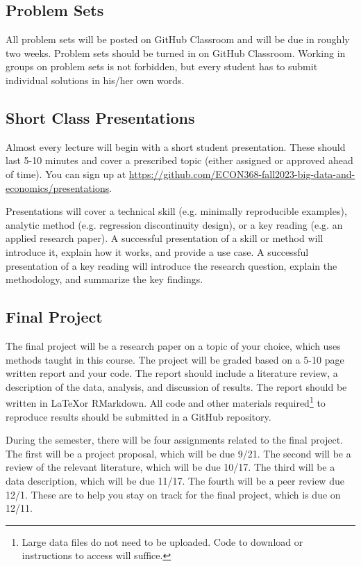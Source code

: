 \documentclass[11pt]{article}
\begin{document}

\subsection*{Problem Sets}

All problem sets will be posted on GitHub Classroom and will be due in roughly two weeks. Problem sets should be turned in on GitHub Classroom. Working in groups on problem sets is not forbidden, but every student has to submit individual solutions in his/her own words.

\subsection*{Short Class Presentations}

Almost every lecture will begin with a short student presentation. These should last 5-10 minutes and cover a prescribed topic (either assigned or approved ahead of time). You can sign up at \url{https://github.com/ECON368-fall2023-big-data-and-economics/presentations}.

Presentations will cover a technical skill (e.g. minimally reproducible examples), analytic method (e.g. regression discontinuity design), or a key reading (e.g. an applied research paper). A successful presentation of a skill or method will introduce it, explain how it works, and provide a use case. A successful presentation of a key reading will introduce the research question, explain the methodology, and summarize the key findings.

\subsection*{Final Project}

The final project will be a research paper on a topic of your choice, which uses methods taught in this course. The project will be graded based on a 5-10 page written report and your code. The report should include a literature review, a description of the data, analysis, and discussion of results. The report should be written in \LaTeX or RMarkdown. All code and other materials required\footnote{Large data files do not need to be uploaded. Code to download or instructions to access will suffice.} to reproduce results should be submitted in a GitHub repository.

During the semester, there will be four assignments related to the final project. The first will be a project proposal, which will be due 9/21. The second will be a review of the relevant literature, which will be due 10/17. The third will be a data description, which will be due 11/17. The fourth will be a peer review due 12/1. These are to help you stay on track for the final project, which is due on 12/11. 
\end{document}
